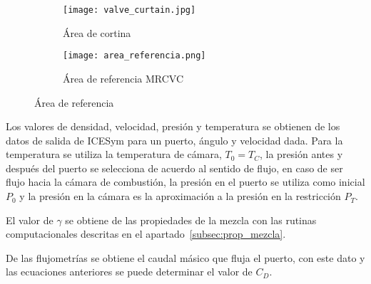 %

\begin{figure}
    \centering
    \begin{subfigure}{0.5\textwidth}
      \centering
      \texttt{[image: valve\_curtain.jpg]}
      \caption{Área de cortina}
    \end{subfigure}%
    \begin{subfigure}{0.5\textwidth}
      \centering
      \texttt{[image: area\_referencia.png]}
      \caption{Área de referencia MRCVC}
    \end{subfigure}
    \caption{Área de referencia}\label{fig:area_referencia}
\end{figure}

Los valores de densidad, velocidad, presión y temperatura se obtienen de los
datos de salida de ICESym para un puerto, ángulo y velocidad dada.
%
Para la temperatura se utiliza la temperatura de cámara, $T_0 = T_C$, la
presión antes y después del puerto se selecciona de acuerdo al sentido de
flujo, en caso de ser flujo hacia la cámara de combustión, la presión en el
puerto se utiliza como inicial $P_0$ y la presión en la cámara es la
aproximación a la presión en la restricción $P_T$.

El valor de $\gamma$ se obtiene de las propiedades de la mezcla con las rutinas
computacionales descritas en el apartado~\ref{subsec:prop_mezcla}.

De las flujometrías se obtiene el caudal másico que fluja el puerto, con este
dato y las ecuaciones anteriores se puede determinar el valor de $C_{D}$.






